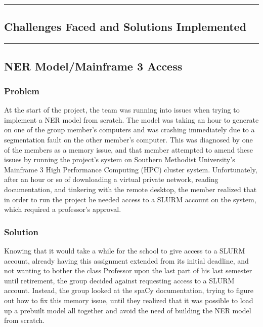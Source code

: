{\color{gray}\hrule}
\begin{center}
\section{Challenges Faced and Solutions Implemented}
\bigskip
\end{center}
{\color{gray}\hrule}

\subsection{NER Model/Mainframe 3 Access}
\subsubsection{Problem}
At the start of the project, the team was running into issues when trying to implement a NER model from scratch. The model was taking an hour to generate on one of the group member's computers and was crashing immediately due to a segmentation fault on the other member's computer. This was diagnosed by one of the members as a memory issue, and that member attempted to amend these issues by running the project's system on Southern Methodist University's Mainframe 3 High Performance Computing (HPC) cluster system. Unfortunately, after an hour or so of downloading a virtual private network, reading documentation, and tinkering with the remote desktop, the member realized that in order to run the project he needed access to a SLURM account on the system, which required a professor's approval.

\subsubsection{Solution}
Knowing that it would take a while for the school to give access to a SLURM account, already having this assignment extended from its initial deadline, and not wanting to bother the class Professor upon the last part of his last semester until retirement, the group decided against requesting access to a SLURM account. Instead, the group looked at the spaCy documentation, trying to figure out how to fix this memory issue, until they realized that it was possible to load up a prebuilt model all together and avoid the need of building the NER model from scratch.

\bigskip